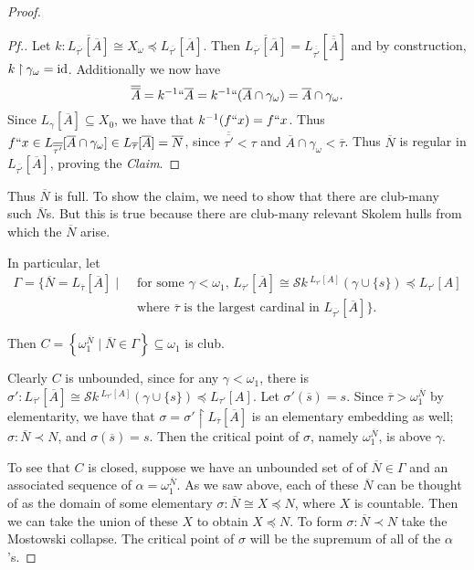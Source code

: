 \documentclass{amsart}
\theoremstyle{definition}
\theoremstyle{remark}
\newcommand{\N}{{\overline{N}}}
\newcommand{\id}{\textup{\ensuremath{\text{id}}}}
\newcommand{\st}{\; | \;}
\newcommand{\set}[2]{\left\{#1\st #2 \right\}}
\newcommand{\rest}{\mathbin{\upharpoonright}}
\newcommand{\SH}{\mathcal{S}\textit{k} \,}
\newcommand{\Sk}[3]{\SH^{#1}( {#2} \cup {#3} ) }
\begin{document}
\begin{proof}
\begin{proof}[Pf.]
Let $k:\overline{L_{\overline{\tau'}}[\overline{A}]} \cong X_\omega \preccurlyeq L_{\overline{\tau'}}[\overline A]$. Then $\overline{L_{\overline{\tau'}}[\overline A]}=L_{\overline{\overline{\tau'}}}[\overline{\overline{A}}]$ and by construction, $k \rest \gamma_\omega = \id$.
Additionally we now have $$\overline{\overline{A}} = k^{-1}``\overline A = k^{-1}``(\overline A \cap \gamma_\omega)=\overline A \cap \gamma_\omega.$$ Since $L_\gamma[\overline A] \subseteq X_0$, we have that $k^{-1}(f``x)=f``x$. Thus $f``x \in L_{\overline{\overline{\tau'}}}[\overline A \cap \gamma_\omega] \in L_{\overline{\tau}}[\overline A] = \N$, since $\overline{\overline{\tau'}} <\tau$ and $\overline A \cap \gamma_\omega < \overline \tau$.
Thus $\N$ is regular in $L_{\overline{\tau'}}[\overline A]$, proving the \textit{Claim}.
\end{proof}
Thus $\N$ is full. To show the claim, we need to show that there are club-many such $\N$s. But this is true because there are club-many relevant Skolem hulls from which the $\N$ arise.

In particular, let
\begin{align*} \Gamma = \Big\{ \N = L_{\overline \tau}[\overline A] \st & \text{ for some $\gamma<\omega_1$, } L_{\overline{\tau}'}[\overline A] \cong \Sk{L_{\tau'}[A]}{\gamma}{\{s\}} \preccurlyeq L_{\tau'}[A] \\
	&\text{ where } \overline \tau \text{ is the largest cardinal in } L_{\overline{\tau'}}[\overline A]\Big\}.
	\end{align*}

Then $C = \set{ \omega_1^\N }{ \N \in \Gamma } \subseteq \omega_1$ is club. 

Clearly $C$ is unbounded, since for any $\gamma < \omega_1$, there is $\sigma' : L_{\overline{\tau}'}[\overline A] \cong \Sk{L_{\tau'}[A]}{\gamma}{\{s\}} \preccurlyeq L_{\tau'}[A]$. Let $\sigma'(\overline s)=s$. Since $\overline \tau > \omega_1^\N$ by elementarity, we have that $\sigma=\sigma' \rest L_{\overline \tau}[\overline A]$ is an elementary embedding as well; $\sigma: \N \prec N$, and $\sigma(\overline s)=s$. Then the critical point of $\sigma$, namely $\omega_1^\N$, is above $\gamma$.

To see that $C$ is closed, suppose we have an unbounded set of of ${\N} \in \Gamma$ and an associated sequence of $\alpha=\omega_1^{{\N}}$. As we saw above, each of these ${\N}$ can be thought of as the domain of some elementary $\sigma: \N \cong X \preccurlyeq N$, where $X$ is countable. Then we can take the union of these $X$ to obtain $X \preccurlyeq N$. To form $\sigma: \N \prec N$ take the Mostowski collapse. The critical point of $\sigma$ will be the supremum of all of the $\alpha$'s.
\end{proof}
\end{document}
